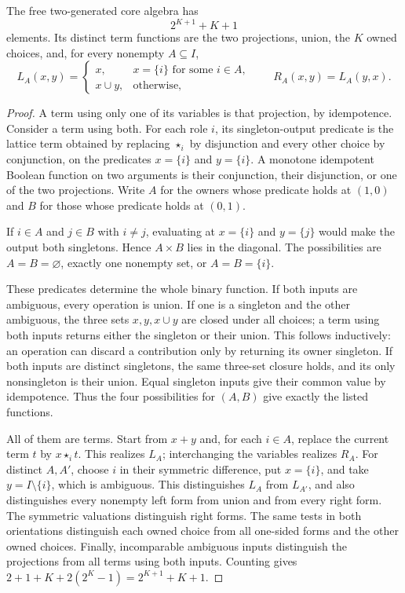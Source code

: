 \begin{proposition}\label{core:prop:binary}
The free two-generated core algebra has
\[
 2^{K+1}+K+1
\]
elements. Its distinct term functions are the two projections, union,
the $K$ owned choices, and, for every nonempty $A\subseteq I$,
\[
 L_A(x,y)=
 \begin{cases}
 x,&x=\{i\}\text{ for some }i\in A,\\
 x\cup y,&\text{otherwise},
 \end{cases}
 \qquad R_A(x,y)=L_A(y,x).
\]
\end{proposition}
\begin{proof}
A term using only one of its variables is that projection, by
idempotence. Consider a term using both. For each role $i$, its
singleton-output predicate is the lattice term obtained by replacing
$\star_i$ by disjunction and every other choice by conjunction,
on the predicates $x=\{i\}$ and $y=\{i\}$. A monotone idempotent
Boolean function on two arguments is their conjunction, their
disjunction, or one of the two projections. Write $A$ for the
owners whose predicate holds at $(1,0)$ and $B$ for those whose
predicate holds at $(0,1)$.

If $i\in A$ and $j\in B$ with $i\ne j$, evaluating at
$x=\{i\}$ and $y=\{j\}$ would make the output both singletons.
Hence $A\times B$ lies in the diagonal. The possibilities are
$A=B=\varnothing$, exactly one nonempty set, or
$A=B=\{i\}$.

These predicates determine the whole binary function. If both
inputs are ambiguous, every operation is union. If one is a
singleton and the other ambiguous, the three sets $x,y,x\cup y$
are closed under all choices; a term using both inputs returns
either the singleton or their union. This follows inductively:
an operation can discard a contribution only by returning its
owner singleton. If both inputs are distinct singletons, the
same three-set closure holds, and its only nonsingleton is their
union. Equal singleton inputs give their common value by idempotence.
Thus the four possibilities for $(A,B)$ give exactly the listed
functions.

All of them are terms. Start from $x+y$ and, for each $i\in A$,
replace the current term $t$ by $x\star_i t$. This realizes $L_A$;
interchanging the variables realizes $R_A$.
For distinct $A,A'$, choose $i$ in their symmetric difference,
put $x=\{i\}$, and take $y=I\setminus\{i\}$, which is ambiguous.
This distinguishes $L_A$ from $L_{A'}$, and also distinguishes
every nonempty left form from union and from every right form.
The symmetric valuations distinguish right forms. The same tests
in both orientations distinguish each owned choice from all
one-sided forms and the other owned choices. Finally, incomparable
ambiguous inputs distinguish the projections from all terms using
both inputs. Counting gives
$2+1+K+2(2^K-1)=2^{K+1}+K+1$.
\end{proof}

